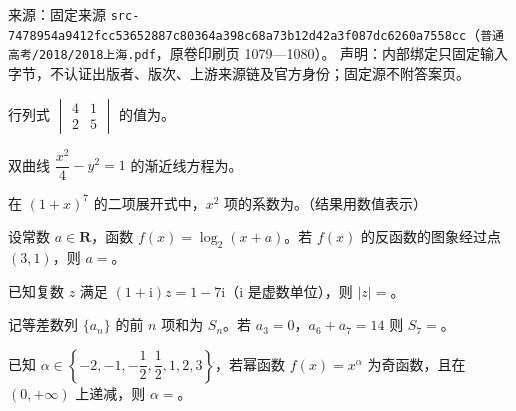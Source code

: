 
\begin{gktip}
来源：固定来源 \texttt{src-7478954a9412fcc53652887c80364a398c68a73b12d42a3f087dc6260a7558cc}（\texttt{普通高考/2018/2018上海.pdf}，原卷印刷页 1079—1080）。
声明：内部绑定只固定输入字节，不认证出版者、版次、上游来源链及官方身份；固定源不附答案页。
\end{gktip}

\par\medskip


\begin{question}
行列式 $\begin{vmatrix} 4 & 1 \\ 2 & 5 \end{vmatrix}$ 的值为\gkblank{}。

\end{question}
\begin{question}
双曲线 $\dfrac{x^2}{4} - y^2 = 1$ 的渐近线方程为\gkblank{}。

\end{question}
\begin{question}
在 $(1 + x)^7$ 的二项展开式中，$x^2$ 项的系数为\gkblank{}。（结果用数值表示）

\end{question}
\begin{question}
设常数 $a \in \mathbf{R}$，函数 $f(x) = \log_2 (x + a)$。若 $f(x)$ 的反函数的图象经过点 $(3, 1)$，则 $a =$\gkblank{}。

\end{question}
\begin{question}
已知复数 $z$ 满足 $(1 + \mathrm{i}) z = 1 - 7\mathrm{i}$（$\mathrm{i}$ 是虚数单位），则 $|z| =$\gkblank{}。

\end{question}
\begin{question}
记等差数列 $\{a_n\}$ 的前 $n$ 项和为 $S_n$。若 $a_3 = 0$，$a_6 + a_7 = 14$ 则 $S_7 =$\gkblank{}。

\end{question}
\begin{question}
已知 $\alpha \in \left\{-2, -1, -\dfrac{1}{2}, \dfrac{1}{2}, 1, 2, 3\right\}$，若幂函数 $f(x) = x^\alpha$ 为奇函数，且在 $(0, +\infty)$ 上递减，则 $\alpha =$\gkblank{}。

\end{question}
